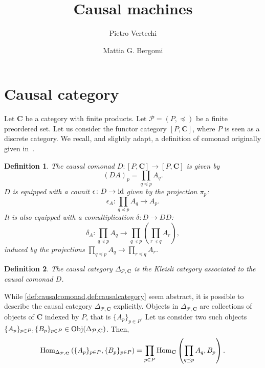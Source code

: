 \documentclass[12pt]{article}
\title{
    Causal machines
    }
\author{
    Pietro Vertechi \and Mattia G. Bergomi
}
\date{}
\newtheorem{definition}{Definition}
\renewcommand{\P}{{\mathcal{P}}}
\newcommand{\Hom}{{\textnormal{Hom}}}
\newcommand{\Obj}{{\textnormal{Obj}}}
\newcommand{\id}{{\textnormal{id}}}
\newcommand{\Cat}{{\mathbf{C}}}
\newcommand{\causal}{{\Delta_{\P, \Cat}}}
\begin{document}
    \maketitle
    \begin{abstract}
    \end{abstract}

    \section{Causal category}
    Let $\Cat$ be a category with finite products. Let $\P = (P, \preceq)$ be a finite preordered set. Let us consider the functor category $[P, \Cat]$, where $P$ is seen as a discrete category. We recall, and slightly adapt, a definition of comonad originally given in~\cite{uustaluComonadicNotionsComputation2008}.
    \begin{definition}\label{def:causalcomonad}
        The {\em causal comonad} $D\colon [P, \Cat] \rightarrow [P, \Cat]$ is given by
        \begin{equation*}
            (DA)_p = \prod_{q \preceq p} A_q.
        \end{equation*}
        $D$ is equipped with a counit $\epsilon\colon D \rightarrow \id$ given by the projection $\pi_p$:
        \begin{equation*}
            \epsilon_A \colon \prod_{q \preceq p} A_q \rightarrow A_p.
        \end{equation*}
        It is also equipped with a comultiplication $\delta\colon D \rightarrow DD$:
        \begin{equation*}
            \delta_A \colon \prod_{q \preceq p} A_q \rightarrow \prod_{q \preceq p} \left(\prod_{r \preceq q} A_r\right),
        \end{equation*}
        induced by the projections $\prod_{q \preceq p} A_q \rightarrow \prod_{r \preceq q} A_r$.
    \end{definition}
    \begin{definition}\label{def:causalcategory}
        The {\em causal category} $\causal$ is the Kleisli category associated to the causal comonad $D$.
    \end{definition}

    While \cref{def:causalcomonad,def:causalcategory} seem abstract, it is possible to describe the causal category $\causal$ explicitly.
    Objects in $\causal$ are collections of objects of $\Cat$ indexed by $P$, that is $\{A_p\}_{p\in P}$. Let us consider two such objects $\{A_p\}_{p\in P}, \{B_p\}_{p\in P} \in \Obj(\causal)$. Then,
    \begin{equation*}
        \Hom_\causal\left(\{A_p\}_{p\in P}, \{B_p\}_{p\in P}\right) =
        \prod_{p \in P} \Hom_\Cat\left(\prod_{q \preceq p} A_q, B_p\right).
    \end{equation*}
\end{document}
